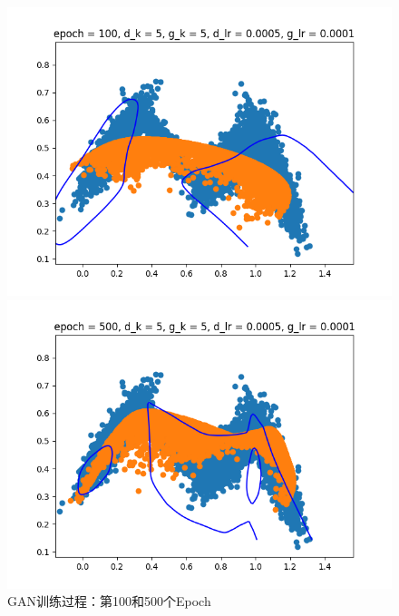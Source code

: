 \documentclass{article}
\begin{document}
\begin{figure}[H]
    \begin{minipage}[H]{0.5\linewidth}
        \centering
        \includegraphics[width=\textwidth]{figures/GAN_0100.png}
    \end{minipage}
    \begin{minipage}[H]{0.5\linewidth}
        \centering
        \includegraphics[width=\textwidth]{figures/GAN_0500.png}
    \end{minipage}
    \caption{GAN训练过程：第100和500个Epoch}
\end{figure}
\end{document}
